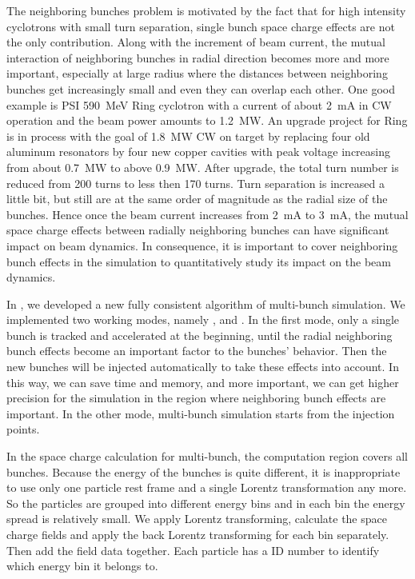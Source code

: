 The neighboring bunches problem is motivated by the fact that for high intensity cyclotrons with small turn
separation, single bunch space charge effects are not the only contribution. Along with the increment of beam
current, the mutual interaction of neighboring bunches in radial direction becomes more and more important,
especially at large radius where the distances between neighboring bunches get increasingly small and even they
can overlap each other. One good example is PSI \SI{590}{\mega\electronvolt} Ring cyclotron with a current of about \SI{2}{\milli\ampere} in
CW operation and the beam power amounts to \SI{1.2}{\mega\watt}. An upgrade project for Ring is in process with
the goal of \SI{1.8}{\mega\watt} CW on target by replacing four old aluminum resonators by four new copper cavities with peak
voltage increasing from about \SI{0.7}{\mega\watt} to above \SI{0.9}{\mega\watt}. After upgrade, the total turn
number is reduced from 200 turns to less then 170 turns.
Turn separation is increased a little bit, but still are at the same order
of magnitude as the radial size of the bunches. Hence once the beam current increases from \SI{2}{\milli\ampere} to \SI{3}{\milli\ampere}, the mutual space
charge effects between radially neighboring bunches can have significant impact on beam dynamics.
In consequence, it is important to cover neighboring bunch effects in the simulation to quantitatively study its impact on the beam dynamics.

In \opalcycl, we developed a new fully consistent algorithm of multi-bunch simulation.  We implemented two working modes, namely ,
 and . In the first mode, only a single bunch is tracked and accelerated at the beginning,
until the radial neighboring bunch effects become an important factor to the bunches' behavior. Then the new bunches will be injected automatically to take these effects into account. In this way, we can save time and memory, and more important,
we can get higher precision for the simulation in the region where neighboring bunch effects are important.
In the other mode, multi-bunch simulation starts from the injection points.

In the space charge calculation for multi-bunch, the computation region covers all bunches.
Because the energy of the bunches is quite different, it is inappropriate to use only one particle rest frame and a single Lorentz transformation any more.
So the particles are grouped into different energy bins and in each bin the energy spread is relatively small. We apply Lorentz transforming, calculate
the space charge fields and apply the back Lorentz transforming for each bin separately. Then add the field data together. Each particle has a ID number to identify
which energy bin it belongs to.


